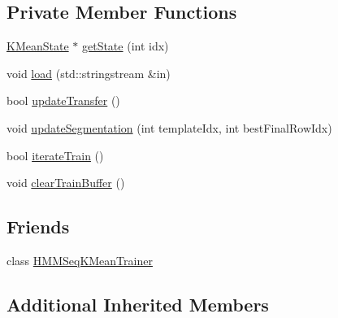 \subsection*{Private Member Functions}
\begin{DoxyCompactItemize}
\item 
\hyperlink{class_k_mean_state}{K\+Mean\+State} $\ast$ \hyperlink{class_h_m_m_k_mean_automaton_ac39190fc7bb62972d52deea3b20faabd}{get\+State} (int idx)
\item 
void \hyperlink{class_h_m_m_k_mean_automaton_a967fcfe7e5e00fd427df2d3f2ce313dc}{load} (std\+::stringstream \&in)
\item 
bool \hyperlink{class_h_m_m_k_mean_automaton_a0b85b69cc37eb2b0e373713a84f25f1a}{update\+Transfer} ()
\item 
void \hyperlink{class_h_m_m_k_mean_automaton_ab6430f6e5ed523fbd62b1954efed27ae}{update\+Segmentation} (int template\+Idx, int best\+Final\+Row\+Idx)
\item 
bool \hyperlink{class_h_m_m_k_mean_automaton_ada3475864afa9e258f2bd173d31acb34}{iterate\+Train} ()
\item 
void \hyperlink{class_h_m_m_k_mean_automaton_ae0b27687ddee80d49c8685175f095a8f}{clear\+Train\+Buffer} ()
\end{DoxyCompactItemize}
\subsection*{Friends}
\begin{DoxyCompactItemize}
\item 
class \hyperlink{class_h_m_m_k_mean_automaton_af469c501c992964354ce9cdaaf140d43}{H\+M\+M\+Seq\+K\+Mean\+Trainer}
\end{DoxyCompactItemize}
\subsection*{Additional Inherited Members}


